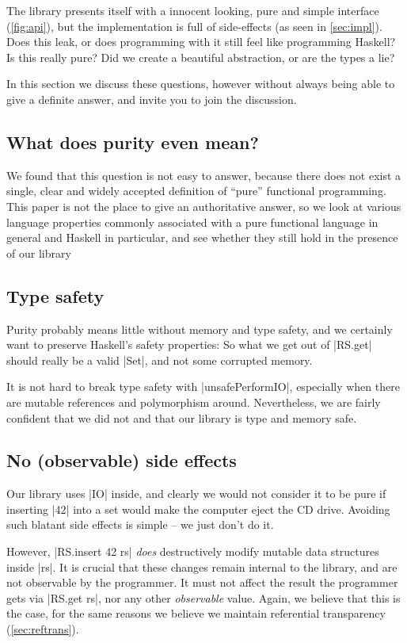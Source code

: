 \documentclass[manuscript,anonymous,screen,acmsmall]{acmart}
\begin{document}
The library presents itself with a innocent looking, pure and simple interface (\cref{fig:api}), but the implementation is full of side-effects (as seen in \cref{sec:impl}).
Does this leak, or does programming with it still feel like programming Haskell?
Is this really pure? Did we create a beautiful abstraction, or are the types a lie?

In this section we discuss these questions, however without always being able to give a definite answer, and invite you to join the discussion.

\subsection{What does purity even mean?}

We found that this question is not easy to answer, because there does not exist a single, clear and widely accepted definition of “pure” functional programming.
This paper is not the place to give an authoritative answer, so we look at various language properties commonly associated with a pure functional language in general and Haskell in particular,
and see whether they still hold in the presence of our library

\subsection{Type safety}

Purity probably means little without memory and type safety, and we certainly want to preserve Haskell's safety properties: So what we get out of |RS.get| should really be a valid |Set|, and not some corrupted memory.

It is not hard to break type safety with |unsafePerformIO|, especially when there are mutable references and polymorphism around. Nevertheless, we are fairly confident that we did not and that our library is type and memory safe.

\subsection{No (observable) side effects}

Our library uses |IO| inside, and clearly we would not consider it to be pure if inserting |42| into a set would make the computer eject the CD drive. Avoiding such blatant side effects is simple -- we just don't do it.

However, |RS.insert 42 rs| \emph{does} destructively modify mutable data structures inside |rs|. It is crucial that these changes remain internal to the library, and are not observable by the programmer. It must not affect the result the programmer gets via |RS.get rs|, nor any other \emph{observable} value. Again, we believe that this is the case, for the same reasons we believe we maintain referential transparency (\cref{sec:reftrans}).
\end{document}
